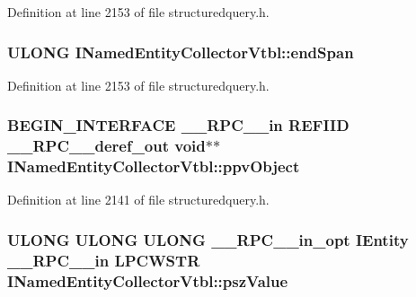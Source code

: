 Definition at line 2153 of file structuredquery.\+h.

\subsubsection[{\texorpdfstring{end\+Span}{endSpan}}]{ {\bf U\+L\+O\+NG} I\+Named\+Entity\+Collector\+Vtbl\+::end\+Span}\hypertarget{struct_i_named_entity_collector_vtbl_abcc298751d9ec8866030295d17ba6c10}{}\label{struct_i_named_entity_collector_vtbl_abcc298751d9ec8866030295d17ba6c10}


Definition at line 2153 of file structuredquery.\+h.

\subsubsection[{\texorpdfstring{ppv\+Object}{ppvObject}}]{\setlength{\rightskip}{0pt plus 5cm}B\+E\+G\+I\+N\+\_\+\+I\+N\+T\+E\+R\+F\+A\+CE {\bf \+\_\+\+\_\+\+R\+P\+C\+\_\+\+\_\+in} {\bf R\+E\+F\+I\+ID} {\bf \+\_\+\+\_\+\+R\+P\+C\+\_\+\+\_\+deref\+\_\+out} {\bf void}$\ast$$\ast$ I\+Named\+Entity\+Collector\+Vtbl\+::ppv\+Object}\hypertarget{struct_i_named_entity_collector_vtbl_a8680ca54dd752d23a7d32d5198190f80}{}\label{struct_i_named_entity_collector_vtbl_a8680ca54dd752d23a7d32d5198190f80}


Definition at line 2141 of file structuredquery.\+h.

\subsubsection[{\texorpdfstring{psz\+Value}{pszValue}}]{ {\bf U\+L\+O\+NG} {\bf U\+L\+O\+NG} {\bf U\+L\+O\+NG} {\bf \+\_\+\+\_\+\+R\+P\+C\+\_\+\+\_\+in\+\_\+opt} {\bf I\+Entity} {\bf \+\_\+\+\_\+\+R\+P\+C\+\_\+\+\_\+in} {\bf L\+P\+C\+W\+S\+TR} I\+Named\+Entity\+Collector\+Vtbl\+::psz\+Value}\hypertarget{struct_i_named_entity_collector_vtbl_a7753894b042161a5fabc5dc75afe4fd8}{}\label{struct_i_named_entity_collector_vtbl_a7753894b042161a5fabc5dc75afe4fd8}


